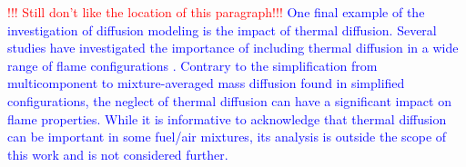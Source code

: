\documentclass[preprint,review,12pt]{elsarticle}
\begin{document}
\textcolor{red}{!!! Still don't like the location of this paragraph!!!}
\textcolor{blue}{One final example of the investigation of diffusion modeling is the impact of thermal diffusion.
Several studies have investigated the importance of including thermal diffusion in a wide range of flame configurations \cite{Coffee:1981,Ern:1998,Ern:1999,Bongers:2003,Yang2010,Xin2012,Dinesh:2016,Schlup2017}.
Contrary to the simplification from multicomponent to mixture-averaged mass diffusion found in simplified configurations, the neglect of thermal diffusion can have a significant impact on flame properties.  
While it is informative to acknowledge that thermal diffusion can be important in some fuel/air mixtures, its analysis is outside the scope of this work and is not considered further.}


\end{document}
